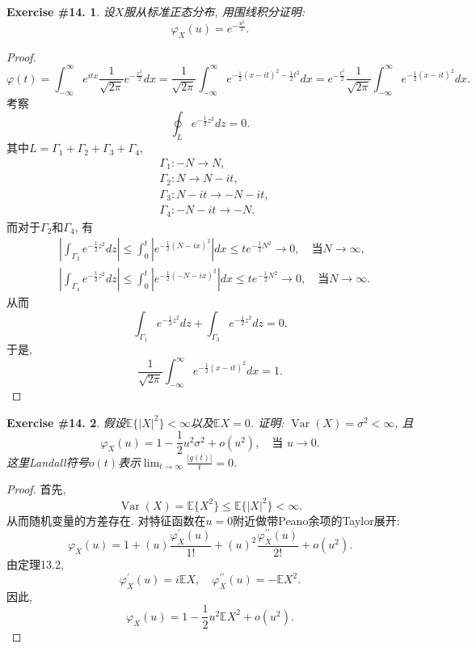 \documentclass[UTF8, a4paper]{article}
\newtheorem{exercise}{Exercise \#14.}
\begin{document}
\begin{framed}
\begin{exercise}
设\(X\)服从标准正态分布, 用围线积分证明:
$$
\varphi_X(u) = e^{-\frac{u^2}{2}}.
$$
\end{exercise}
\end{framed}

\begin{proof}
$$
\varphi(t) = \int_{-\infty}^{\infty} e^{itx} \frac{1}{\sqrt{2\pi}} e^{-\frac{x^2}{2}} dx = \frac{1}{\sqrt{2\pi}} \int_{-\infty}^{\infty}  e^{-\frac{1}{2}(x - it)^2 -\frac{1}{2}t^2} dx = e^{-\frac{t^2}{2}} \frac{1}{\sqrt{2\pi}} \int_{-\infty}^{\infty} e^{-\frac{1}{2}(x-it)^2} dx.
$$
考察
$$
\oint_L e^{-\frac{1}{2}z^2} dz = 0.
$$
其中\(L = \Gamma_1 + \Gamma_2 + \Gamma_3 + \Gamma_4\), 
\begin{align*}
    & \Gamma_1 : -N \to N, \\
    & \Gamma_2: N \to N -it , \\
    & \Gamma_3: N - it \to -N - it, \\
    & \Gamma_4: -N - it \to -N.
\end{align*}
而对于\(\Gamma_2\)和\(\Gamma_4\), 有
$$
\begin{aligned}
    &\left|\int_{\Gamma_2}^{} e^{-\frac{1}{2}z^2} dz\right| \leq \int_{0}^{t} \left|e^{-\frac{1}{2}(N - ix)^2}\right| dx \leq t e^{-\frac{1}{2}N^2} \to 0, \quad \text{当} N \to \infty,\\
    &\left|\int_{\Gamma_4}^{} e^{-\frac{1}{2}z^2} dz\right| \leq \int_{0}^{t} \left|e^{-\frac{1}{2}(-N - ix)^2}\right| dx \leq t e^{-\frac{1}{2}N^2} \to 0, \quad \text{当} N \to \infty.
\end{aligned}
$$
从而
$$
\int_{\Gamma_1}^{} e^{-\frac{1}{2}z^2} dz + \int_{\Gamma_3}^{} e^{-\frac{1}{2}z^2} dz = 0.
$$
于是, 
$$
\frac{1}{\sqrt{2\pi}} \int_{-\infty}^{\infty} e^{-\frac{1}{2}(x-it)^2} dx = 1.
$$

\end{proof}


\begin{framed}
\begin{exercise}
假设\(\mathbb{E}\{|X|^2\} < \infty\)以及\(\mathbb{E}X = 0\).
证明:  \(\operatorname{Var}(X) = \sigma^2 < \infty\), 且
$$
\varphi_X(u)=1-\frac{1}{2} u^2 \sigma^2+o\left(u^2\right), \quad \text{当 } u \to 0.
$$
这里Landall符号\(o(t)\)表示\(\lim_{t\to\infty} \frac{|g(t)|}{t} = 0\).
\end{exercise}
\end{framed}


\begin{proof}
首先, 
$$
\operatorname{Var}(X) = \mathbb{E}\{X^2\} \leq \mathbb{E}\{|X|^2\} < \infty.
$$
从而随机变量的方差存在.
对特征函数在\(u = 0\)附近做带Peano余项的Taylor展开:
$$
\varphi_X(u) = 1 + (u)\frac{\varphi_X^\prime(u)}{1!} + (u)^2 \frac{\varphi_X^{\prime \prime}(u) }{2!} + o(u^2).
$$
由定理13.2, 
$$
\varphi_X^\prime(u) = i \mathbb{E}X, \quad \varphi_X^{\prime \prime}(u) = -\mathbb{E}X^2.
$$
因此, 
$$
\varphi_X(u) = 1 - \frac{1}{2} u^2 \mathbb{E}X^2 + o(u^2).
$$
\end{proof}
\end{document}
